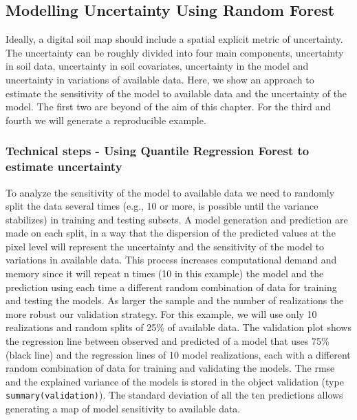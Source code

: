 \documentclass[10pt,b5paper,]{book}
\theoremstyle{definition}
\theoremstyle{definition}
\theoremstyle{definition}
\theoremstyle{remark}
\begin{document}
\hypertarget{modelling-uncertainty-using-random-forest}{%
\subsection{Modelling Uncertainty Using Random
Forest}\label{modelling-uncertainty-using-random-forest}}

Ideally, a digital soil map should include a spatial explicit metric of
uncertainty. The uncertainty can be roughly divided into four main
components, uncertainty in soil data, uncertainty in soil covariates,
uncertainty in the model and uncertainty in variations of available
data. Here, we show an approach to estimate the sensitivity of the model
to available data and the uncertainty of the model. The first two are
beyond of the aim of this chapter. For the third and fourth we will
generate a reproducible example.

\hypertarget{technical-steps---using-quantile-regression-forest-to-estimate-uncertainty}{%
\subsubsection{Technical steps - Using Quantile Regression Forest to
estimate
uncertainty}\label{technical-steps---using-quantile-regression-forest-to-estimate-uncertainty}}

To analyze the sensitivity of the model to available data we need to
randomly split the data several times (e.g., 10 or more, is possible
until the variance stabilizes) in training and testing subsets. A model
generation and prediction are made on each split, in a way that the
dispersion of the predicted values at the pixel level will represent the
uncertainty and the sensitivity of the model to variations in available
data. This process increases computational demand and memory since it
will repeat n times (10 in this example) the model and the prediction
using each time a different random combination of data for training and
testing the models. As larger the sample and the number of realizations
the more robust our validation strategy. For this example, we will use
only 10 realizations and random splits of 25\% of available data. The
validation plot shows the regression line between observed and predicted
of a model that uses 75\% (black line) and the regression lines of 10
model realizations, each with a different random combination of data for
training and validating the models. The rmse and the explained variance
of the models is stored in the object validation (type
\texttt{summary(validation)}). The standard deviation of all the ten
predictions allows generating a map of model sensitivity to available
data.
\end{document}
